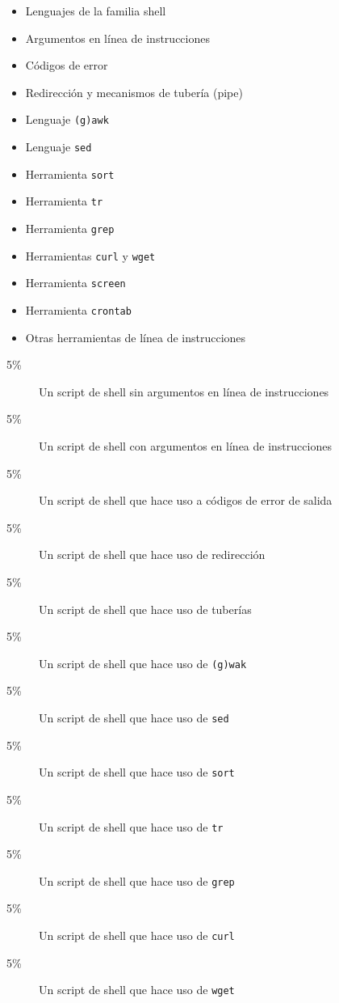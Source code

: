 \documentclass{article}
\begin{document}
\begin{multicols}{4}
\begin{itemize}
\item{Lenguajes de la familia shell}
\item{Argumentos en l\'{i}nea de instrucciones}
\item{C\'{o}digos de error}
\item{Redirecci\'{o}n y mecanismos de tuber\'{i}a (pipe)}
\item{Lenguaje \texttt{(g)awk}}
\item{Lenguaje \texttt{sed}}
\item{Herramienta \texttt{sort}}  
\item{Herramienta \texttt{tr}}
\item{Herramienta \texttt{grep}}
\item{Herramientas \texttt{curl} y \texttt{wget}}  
\item{Herramienta \texttt{screen}}
\item{Herramienta \texttt{crontab}}
\item{Otras herramientas de l\'{i}nea de instrucciones}
\end{itemize}

\begin{description}

\item[5\%]{Un script de shell sin argumentos en l\'{i}nea de instrucciones}
\item[5\%]{Un script de shell con argumentos en l\'{i}nea de instrucciones}

\item[5\%]{Un script de shell que hace uso a c\'{o}digos de error de salida}
\item[5\%]{Un script de shell que hace uso de redirecci\'{o}n}

\item[5\%]{Un script de shell que hace uso de tuber\'{i}as}
\item[5\%]{Un script de shell que hace uso de \texttt{(g)wak}}

\item[5\%]{Un script de shell que hace uso de \texttt{sed}}
\item[5\%]{Un script de shell que hace uso de \texttt{sort}}

\item[5\%]{Un script de shell que hace uso de \texttt{tr}}
\item[5\%]{Un script de shell que hace uso de \texttt{grep}}

\item[5\%]{Un script de shell que hace uso de \texttt{curl}}
\item[5\%]{Un script de shell que hace uso de \texttt{wget}}  


\end{description}
\end{multicols}
\end{document}
